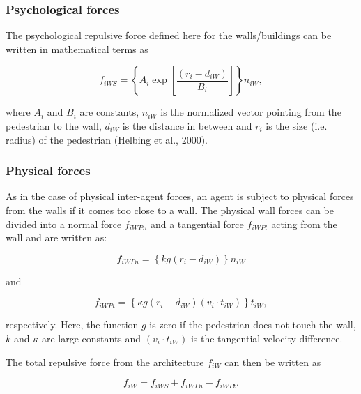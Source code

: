 \documentclass[11pt]{article}
\begin{document}
\subsubsection{Psychological forces}

The psychological repulsive force defined here for the walls/buildings can be written in mathematical terms as

\begin{equation}
	{f_{iWS}} = \left\{ {{A_i}\exp \left[ {\frac{{\left( {{r_i} - {d_{iW}}} \right)}}{{{B_i}}}} \right]} \right\}{n_{iW}} ,
	\label{eq:fiWS}
\end{equation}

where $A_i$ and $B_i$ are constants, $n_{iW}$ is the normalized vector pointing from the pedestrian to the wall, $d_{iW}$ is the distance in between and $r_i$ is the size (i.e. radius) of the pedestrian (Helbing et al., 2000).

\subsubsection{Physical forces}
As in the case of physical inter-agent forces, an agent is subject to physical forces from the walls if it comes too close to a wall. The physical wall forces can be divided into a normal force $f_{iWPn}$ and a tangential force $f_{iWPt}$ acting from the wall and are written as:

\begin{equation}
	{f_{iWPn}} = \left\{ {kg\left( {{r_i} - {d_{iW}}} \right)} \right\}{n_{iW}}
	\label{eq:fiWPn}
\end{equation}

and

\begin{equation}
	{f_{iWPt}} = \left\{ {\kappa g\left( {{r_i} - {d_{iW}}} \right)\left( {{v_i} \cdot {t_{iW}}} \right)} \right\}{t_{iW}} ,
	\label{eq:fiWPt}
\end{equation}

respectively. Here, the function $g$ is zero if the pedestrian does not touch the wall, $k$ and $\kappa$ are large constants and $(v_i \cdot t_{iW})$ is the tangential velocity difference.

The total repulsive force from the architecture $f_{iW}$ can then be written as

\begin{equation}
	{f_{iW}} = {f_{iWS}} + {f_{iWPn}} - {f_{iWPt}} .
	\label{eq:fiW}
\end{equation}
\end{document}
